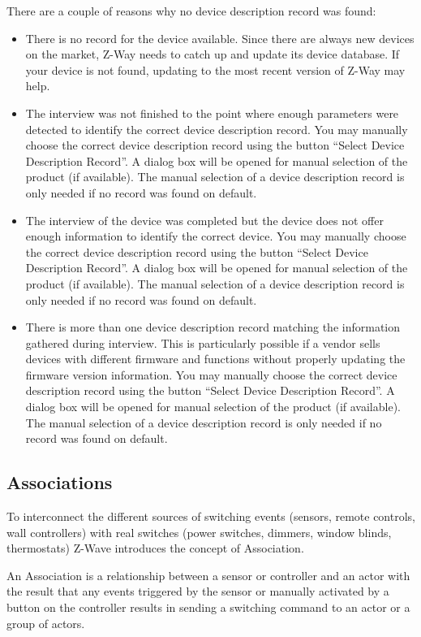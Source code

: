 There are a couple of reasons why no device description record was found:
\begin{itemize}
\item  There is no record for the device available. Since there are always new devices on the 
market, Z-Way needs to catch up and update its device database. If your device is not found, 
updating to the most recent version of Z-Way may help.
\item  The interview was not finished to the point where enough parameters were detected to identify 
the correct device description record. You may manually choose the correct device description record 
using the button “Select Device Description Record”. A dialog box will be opened for manual selection 
of the product (if available). The manual selection of a device description record is only needed if 
no record was found on default.  
\item  The interview of the device was completed but the device does not offer enough information to 
identify the correct device. You may manually choose the correct device description record using the 
button “Select Device Description Record”. A dialog box will be opened for manual selection of the 
product (if available). The manual selection of a device description record is only needed if no 
record was found on default.
\item  There is more than one device description record matching the information gathered during 
interview.  This is particularly possible if a vendor sells devices with different firmware and 
functions without properly updating the firmware version information. You may manually choose the 
correct device description record using the button “Select Device Description Record”. A dialog box 
will be opened for manual selection of the product (if available). The manual selection of a device 
description record is only needed if no record was found on default.
\end{itemize}
\subsection{Associations}

To interconnect the different sources of switching events (sensors, remote controls, wall controllers) 
with real switches (power switches, dimmers, window blinds, thermostats) Z-Wave introduces the concept 
of Association.

An Association is a relationship between a sensor or controller and an actor with the result that 
any events triggered by the sensor or manually activated by a button on the controller results in 
sending a switching command to an actor or a group of actors.


